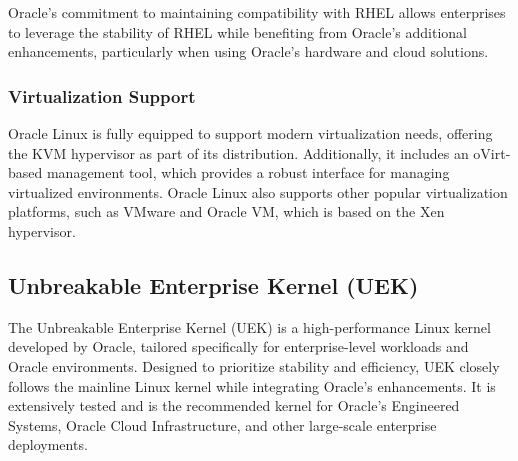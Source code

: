 Oracle’s commitment to maintaining compatibility with RHEL allows enterprises to leverage the stability of RHEL while benefiting from Oracle’s additional enhancements, particularly when using Oracle's hardware and cloud solutions.

\subsubsection[Virtualization Support]{Virtualization Support}
Oracle Linux is fully equipped to support modern virtualization needs, offering the KVM hypervisor as part of its distribution. Additionally, it includes an oVirt-based management tool, which provides a robust interface for managing virtualized environments. Oracle Linux also supports other popular virtualization platforms, such as VMware and Oracle VM, which is based on the Xen hypervisor.


\subsection{Unbreakable Enterprise Kernel (UEK)}
The Unbreakable Enterprise Kernel (UEK) is a high-performance Linux kernel developed by Oracle, tailored specifically for enterprise-level workloads and Oracle environments. Designed to prioritize stability and efficiency, UEK closely follows the mainline Linux kernel while integrating Oracle’s enhancements. It is extensively tested and is the recommended kernel for Oracle’s Engineered Systems, Oracle Cloud Infrastructure, and other large-scale enterprise deployments.

